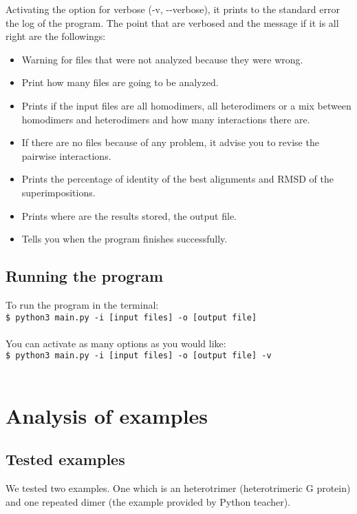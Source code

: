 \documentclass[a4paper,10pt]{report}
\begin{document}
Activating the option for verbose (-v, -{}-verbose), it prints to the standard error the log of the program. The point that are verbosed and the message if it is all right are the followings:

\begin{itemize}
 \item Warning for files that were not analyzed because they were wrong.
 \item Print how many files are going to be analyzed.
 \item Prints if the input files are all homodimers, all heterodimers or a mix between homodimers and heterodimers and how many interactions there are.
 \item If there are no files because of any problem, it advise you to revise the pairwise interactions.
 \item Prints the percentage of identity of the best alignments and RMSD of the superimpositions.
 \item Prints where are the results stored, the output file.
 \item Tells you when the program finishes successfully.
\end{itemize}

\section{Running the program}

To run the program in the terminal:\\ \texttt{\$ python3 main.py -i [input files] -o [output file]} \\\\ You can activate as many options as you would like:\\ \texttt{\$ python3 main.py -i [input files] -o [output file] -v }\\\\



\chapter{Analysis of examples}

\section{Tested examples}

We tested two examples. One which is an heterotrimer (heterotrimeric G protein) and one repeated dimer (the example provided by Python teacher).
\end{document}
